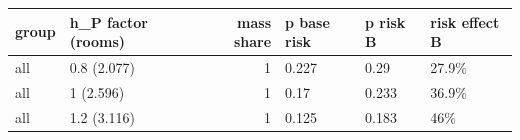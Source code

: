 \begingroup\small
\setlength{\tabcolsep}{3pt}
\renewcommand{\arraystretch}{1.04}
\begin{tabularx}{\linewidth}{XXrXXX}
\toprule
group & h\_P factor (rooms) & mass share & p base risk & p risk B & risk effect B \\
\midrule
all & 0.8 (2.077) & 1 & 0.227 & 0.29 & 27.9\% \\
all & 1 (2.596) & 1 & 0.17 & 0.233 & 36.9\% \\
all & 1.2 (3.116) & 1 & 0.125 & 0.183 & 46\% \\
\bottomrule
\end{tabularx}
\endgroup
